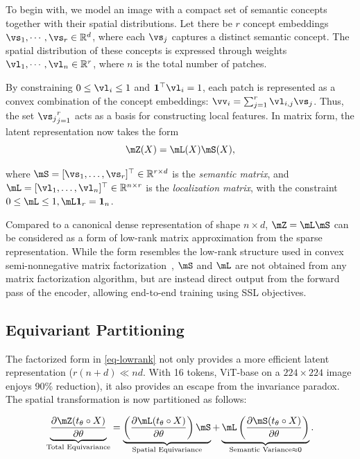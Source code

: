 To begin with, we model an image with a compact set of semantic concepts together with their spatial distributions. Let there be $r$ concept embeddings $\vs_1, \cdots, \vs_r \in \mathbb{R}^d$,
where each $\vs_j$ captures a distinct semantic concept. The spatial distribution of these concepts is expressed through weights $\vl_1, \cdots, \vl_n \in \mathbb{R}^{r}$, where $n$ is the total number of patches. 

By constraining $0 \leq \vl_i \leq 1$ and $\mathbf{1}^\top \vl_i = 1$, each patch is represented as a convex combination of the concept embeddings: $\vv_i = \sum_{j=1}^r \vl_{i,j} \vs_j$. Thus, the set ${\vs_j}_{j=1}^r$ acts as a basis for constructing local features. In matrix form, the latent representation now takes the form
\begin{equation}\label{eq-lowrank}
    \mZ(X) = \mL(X) \mS(X), 
\end{equation}

where
$\mS = [\vs_1, \ldots, \vs_r]^\top \in \mathbb{R}^{r \times d}$ is the \textit{semantic matrix}, and $\mL = [\vl_1, \ldots, \vl_n]^\top \in \mathbb{R}^{n \times r}$ is the \textit{localization matrix}, with the constraint $0 \leq \mL \leq 1, \mL \mathbf{1}_r =\mathbf{1}_n$.


Compared to a canonical dense representation of shape $n\times d$, $\mZ = \mL \mS$ can be considered as a form of low-rank matrix approximation from the sparse representation. While the form resembles the low-rank structure used in convex semi-nonnegative matrix factorization~\citep{ding2008convex},  $\mS$ and $\mL$ are not obtained from any matrix factorization algorithm, but are instead direct output from the forward pass of the encoder,  allowing end-to-end training  using SSL objectives.


\subsection{Equivariant Partitioning}

The factorized form in \eqref{eq-lowrank} not only provides a more efficient latent representation ($r(n+d) \ll nd$. With 16 tokens, ViT-base on a $224\times 224$ image enjoys 90\% reduction), it also provides an escape from the invariance paradox. The spatial transformation is now partitioned as follows:

\begin{equation}
    \underbrace{\frac{\partial \mZ(t_\theta \circ X)}{\partial \theta}}_{\text{Total Equivariance}} = 
    \underbrace{\left( \frac{\partial \mL(t_\theta \circ X)}{\partial \theta} \right) \mS}_{\substack{\text{Spatial Equivariance} }} + 
    \underbrace{\mL \left( \frac{\partial \mS(t_\theta \circ X)}{\partial \theta} \right)}_{\text{Semantic Variance} \approx 0}.
\label{eq:factorized_equivariance}
\end{equation}

